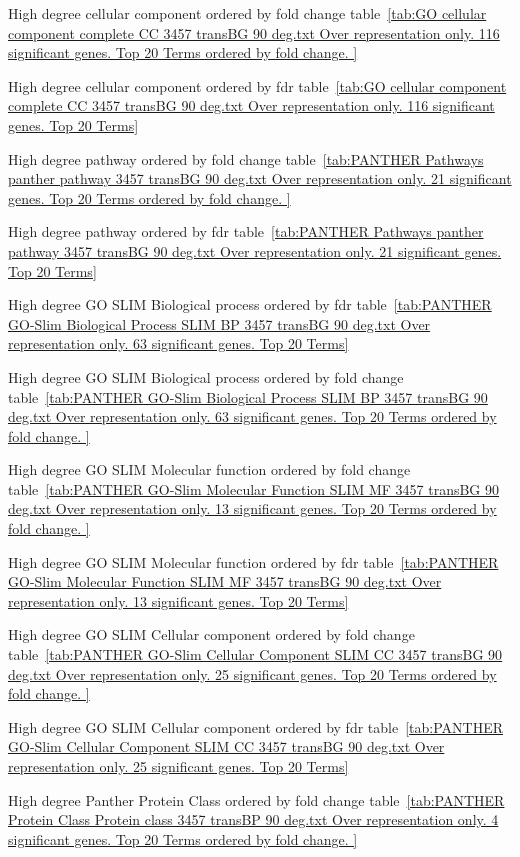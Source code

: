High degree cellular component ordered by fold change table~\ref{tab:GO cellular component complete CC 3457 transBG 90 deg.txt Over representation only. 116 significant genes. Top 20 Terms ordered by fold change. }


High degree cellular component ordered by fdr table~\ref{tab:GO cellular component complete CC 3457 transBG 90 deg.txt Over representation only. 116 significant genes. Top 20 Terms}

High degree pathway
ordered by fold change table~\ref{tab:PANTHER Pathways panther pathway 3457 transBG 90 deg.txt Over representation only. 21 significant genes. Top 20 Terms ordered by fold change. }


High degree pathway
ordered by fdr table~\ref{tab:PANTHER Pathways panther pathway 3457 transBG 90 deg.txt Over representation only. 21 significant genes. Top 20 Terms}

High degree GO SLIM Biological process
ordered by fdr table~\ref{tab:PANTHER GO-Slim Biological Process SLIM BP 3457 transBG 90 deg.txt Over representation only. 63 significant genes. Top 20 Terms}

High degree GO SLIM Biological process ordered by fold change table~\ref{tab:PANTHER GO-Slim Biological Process SLIM BP 3457 transBG 90 deg.txt Over representation only. 63 significant genes. Top 20 Terms ordered by fold change. }

High degree GO SLIM Molecular function
ordered by fold change table~\ref{tab:PANTHER GO-Slim Molecular Function SLIM MF 3457 transBG 90 deg.txt Over representation only. 13 significant genes. Top 20 Terms ordered by fold change. }






High degree GO SLIM Molecular function
ordered by fdr table~\ref{tab:PANTHER GO-Slim Molecular Function SLIM MF 3457 transBG 90 deg.txt Over representation only. 13 significant genes. Top 20 Terms}

High degree GO SLIM Cellular component ordered by fold change table~\ref{tab:PANTHER GO-Slim Cellular Component SLIM CC 3457 transBG 90 deg.txt Over representation only. 25 significant genes. Top 20 Terms ordered by fold change. }

High degree GO SLIM Cellular component ordered by fdr table~\ref{tab:PANTHER GO-Slim Cellular Component SLIM CC 3457 transBG 90 deg.txt Over representation only. 25 significant genes. Top 20 Terms}




High degree Panther Protein Class ordered by fold change table~\ref{tab:PANTHER Protein Class Protein class 3457 transBP 90 deg.txt Over representation only. 4 significant genes. Top 20 Terms ordered by fold change. }



